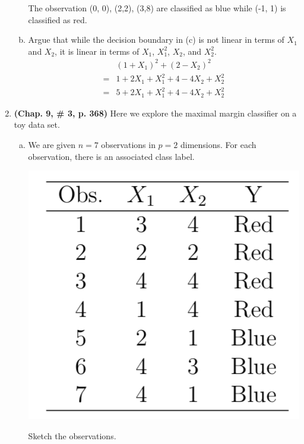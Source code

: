 \documentclass[12pt,fleqn]{article}\usepackage[]{graphicx}\usepackage[]{color}
\newenvironment{knitrout}{}{} %
\theoremstyle{definition}
\begin{document}
\begin{enumerate}[1.]
\begin{enumerate}[(a)]
\begin{knitrout}
\end{knitrout}
          The observation (0, 0), (2,2), (3,8) are classified as blue while (-1, 1) is classified as red.
          \item Argue that while the decision boundary in (c) is not linear in terms of $X_1$ and $X_2$, it is linear in terms of $X_1$, $X_1^2$, $X_2$, and $X_2^2$.
          \begin{align*}
              &\left(1+X_{1}\right)^{2}+\left(2-X_{2}\right)^{2}\\
            = &1 + 2X_{1} + X_{1}^2 + 4 - 4X_{2} + X_{2}^2\\
            = &5 + 2X_{1} + X_{1}^2 + 4 - 4X_{2} + X_{2}^2
          \end{align*}
        \end{enumerate}
    \item \textbf{(Chap. 9, \# 3, p. 368)} Here we explore the maximal margin classifier on a toy data set.
        \begin{enumerate}[(a)]
          \item We are given $n = 7$ observations in $p = 2$ dimensions. For each observation, there is an associated class label.\\
            \begin{center}
              \includegraphics[scale=0.65]{table}
            \end{center}
            Sketch the observations.\\
\begin{knitrout}
\color{fgcolor}


\end{knitrout}
\end{enumerate}
\end{enumerate}
\end{document}
